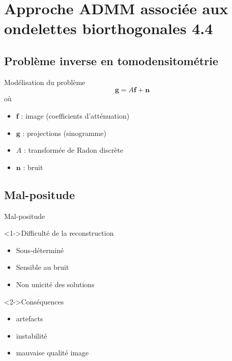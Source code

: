 \section{Approche ADMM associée aux ondelettes biorthogonales 4.4}

\subsection{Problème inverse en tomodensitométrie}
\begin{frame}{Modélisation du problème}
        \begin{equation}
            \mathbf{g} = A \mathbf{f} + \mathbf{n}
        \end{equation}
        où \begin{itemize}
            \item \( \mathbf{f} \) : image (coefficients d'atténuation)
            \item \( \mathbf{g} \) : projections (sinogramme)
            \item \( A \) : transformée de Radon discrète
            \item \( \mathbf{n} \) : bruit
        \end{itemize}
\end{frame}

\subsection{Mal-positude}
\begin{frame}{Mal-positude}
    \transfade
    \begin{block}<1->{Difficulté de la reconstruction}
        \begin{itemize}
            \item Sous-déterminé
            \item Sensible au bruit
            \item Non unicité des solutions
        \end{itemize}
    \end{block}

    \begin{block}<2->{Conséquences}
        \begin{itemize}
            \item artefacts
            \item instabilité
            \item mauvaise qualité image
        \end{itemize}
    \end{block}
\end{frame}

